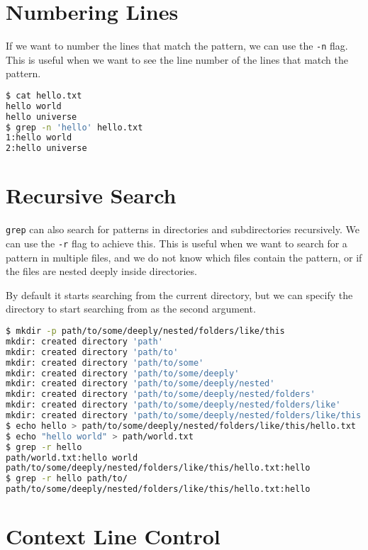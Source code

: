 \section{Numbering Lines}

If we want to number the lines that match the pattern, we can use the \lstinline|-n| flag. This is useful when we want to see the line number of the lines that match the pattern.

\begin{lstlisting}[language=bash]
$ cat hello.txt
hello world
hello universe
$ grep -n 'hello' hello.txt
1:hello world
2:hello universe
\end{lstlisting}

\section{Recursive Search}

\lstinline|grep| can also search for patterns in directories and subdirectories recursively. We can use the \lstinline|-r| flag to achieve this. This is useful when we want to search for a pattern in multiple files, and we do not know which files contain the pattern, or if the files are nested deeply inside directories.

By default it starts searching from the current directory, but we can specify the directory to start searching from as the second argument.

\begin{lstlisting}[language=bash]
$ mkdir -p path/to/some/deeply/nested/folders/like/this
mkdir: created directory 'path'
mkdir: created directory 'path/to'
mkdir: created directory 'path/to/some'
mkdir: created directory 'path/to/some/deeply'
mkdir: created directory 'path/to/some/deeply/nested'
mkdir: created directory 'path/to/some/deeply/nested/folders'
mkdir: created directory 'path/to/some/deeply/nested/folders/like'
mkdir: created directory 'path/to/some/deeply/nested/folders/like/this'
$ echo hello > path/to/some/deeply/nested/folders/like/this/hello.txt
$ echo "hello world" > path/world.txt
$ grep -r hello
path/world.txt:hello world
path/to/some/deeply/nested/folders/like/this/hello.txt:hello
$ grep -r hello path/to/
path/to/some/deeply/nested/folders/like/this/hello.txt:hello
\end{lstlisting}

\section{Context Line Control}

